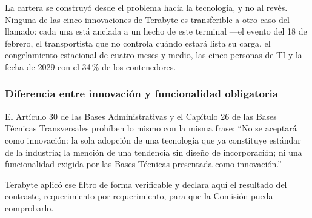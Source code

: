 \begin{bloquePropuesta}
La cartera se construyó desde el problema hacia la tecnología, y no al revés.
Ninguna de las cinco innovaciones de Terabyte es transferible a otro caso del
llamado: cada una está anclada a un hecho de este terminal —el evento del 18 de
febrero, el transportista que no controla cuándo estará lista su carga, el
congelamiento estacional de cuatro meses y medio, las cinco personas de TI y la
fecha de 2029 con el 34\,\% de los contenedores.
\end{bloquePropuesta}

\subsubsection{Diferencia entre innovación y funcionalidad obligatoria}

El Artículo 30\textdegree{} de las Bases Administrativas y el Capítulo 26 de
las Bases Técnicas Transversales prohíben lo mismo con la misma frase:
\enquote{No se aceptará como innovación: la sola adopción de una tecnología que
ya constituye estándar de la industria; la mención de una tendencia sin diseño
de incorporación; ni una funcionalidad exigida por las Bases Técnicas
presentada como innovación.}

Terabyte aplicó ese filtro de forma verificable y declara aquí el resultado del
contraste, requerimiento por requerimiento, para que la Comisión pueda
comprobarlo.

